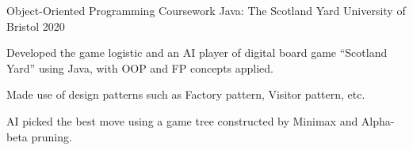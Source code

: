 \begin{cventries}

  \cventry
    {Object-Oriented Programming Coursework} %
    {Java: The Scotland Yard} %
    {University of Bristol} %
    {2020} %
    {
      \begin{cvitems} %
        \item {Developed the game logistic and an AI player of digital board game “Scotland Yard” using Java, with OOP and FP concepts applied.}
        \item {Made use of design patterns such as Factory pattern, Visitor pattern, etc.}
        \item {AI picked the best move using a game tree constructed by Minimax and Alpha-beta pruning.}
      \end{cvitems}
    }



\end{cventries}
